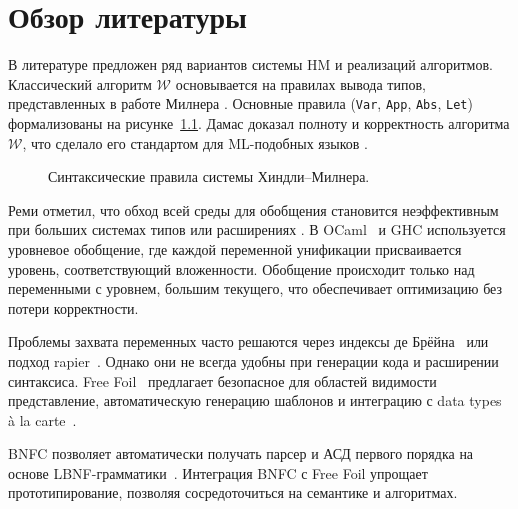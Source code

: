 \chapter{Обзор литературы}
\label{chap:background}

В литературе предложен ряд вариантов системы HM и реализаций алгоритмов. Классический алгоритм $\mathcal{W}$ основывается на правилах вывода типов, представленных в работе Милнера \cite{Milner1978_TypePolymorphism}. Основные правила (\texttt{Var}, \texttt{App}, \texttt{Abs}, \texttt{Let}) формализованы на рисунке~\ref{fig:syntactical-hm-rules}. Дамас доказал полноту и корректность алгоритма $\mathcal{W}$, что сделало его стандартом для ML-подобных языков \cite{Damas1984_TypeAssignment}.

\begin{figure}[H]
  \caption{Синтаксические правила системы Хиндли–Милнера.}
  \label{fig:syntactical-hm-rules}
\end{figure}

Реми отметил, что обход всей среды для обобщения становится неэффективным при больших системах типов или расширениях \cite{Remy1992_SortedEqTheoryTypes}. В OCaml~\cite{Kiselyov2022_OCamplTypeChecker} и GHC используется уровневое обобщение, где каждой переменной унификации присваивается уровень, соответствующий вложенности. Обобщение происходит только над переменными с уровнем, большим текущего, что обеспечивает оптимизацию без потери корректности.

Проблемы захвата переменных часто решаются через индексы де Брёйна~\cite{deBruijn1972} или подход rapier~\cite{Simon2002_SecretsGHC}. Однако они не всегда удобны при генерации кода и расширении синтаксиса. Free Foil~\cite{FreeFoil} предлагает безопасное для областей видимости представление, автоматическую генерацию шаблонов и интеграцию с data types à la carte~\cite{Swierstra2008_a_la_carte}.

BNFC позволяет автоматически получать парсер и АСД первого порядка на основе LBNF-грамматики~\cite{BNFC}. Интеграция BNFC с Free Foil упрощает прототипирование, позволяя сосредоточиться на семантике и алгоритмах.
